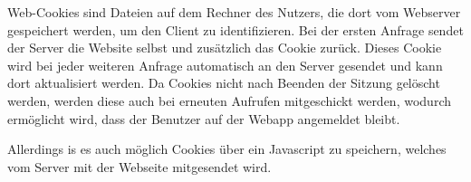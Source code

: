 
Web-Cookies sind Dateien auf dem Rechner des Nutzers, die dort vom Webserver gespeichert werden, um den Client zu identifizieren. Bei der ersten Anfrage sendet der Server die Website selbst und zusätzlich das Cookie zurück. Dieses Cookie wird bei jeder weiteren Anfrage automatisch an den Server gesendet und kann dort aktualisiert werden. Da Cookies nicht nach Beenden der Sitzung gelöscht werden, werden diese auch bei erneuten Aufrufen mitgeschickt werden, wodurch ermöglicht wird, dass der Benutzer auf der Webapp angemeldet bleibt. 

Allerdings is es auch möglich Cookies über ein Javascript zu speichern, welches vom Server mit der Webseite mitgesendet wird. 
\cite{wikiCookies}
